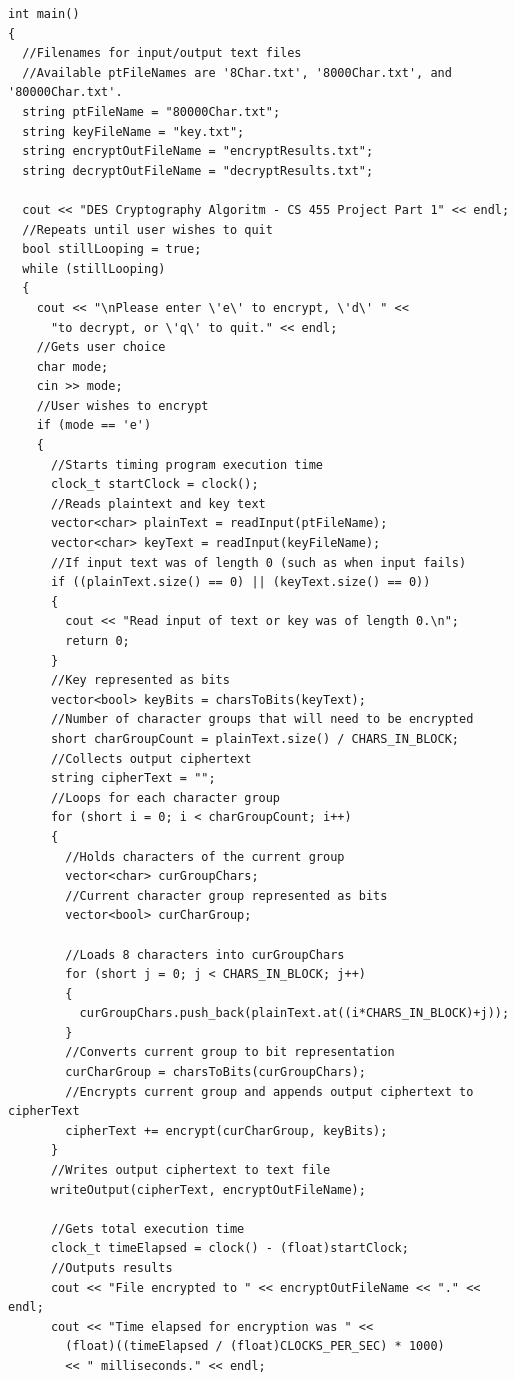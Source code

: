 \documentclass[11pt]{article}
\begin{document}
\begin{verbatim}
int main()
{
  //Filenames for input/output text files
  //Available ptFileNames are '8Char.txt', '8000Char.txt', and '80000Char.txt'.
  string ptFileName = "80000Char.txt";
  string keyFileName = "key.txt";
  string encryptOutFileName = "encryptResults.txt";
  string decryptOutFileName = "decryptResults.txt";

  cout << "DES Cryptography Algoritm - CS 455 Project Part 1" << endl;
  //Repeats until user wishes to quit
  bool stillLooping = true;
  while (stillLooping)
  {
    cout << "\nPlease enter \'e\' to encrypt, \'d\' " <<
      "to decrypt, or \'q\' to quit." << endl;
    //Gets user choice
    char mode;
    cin >> mode;
    //User wishes to encrypt
    if (mode == 'e')
    {
      //Starts timing program execution time
      clock_t startClock = clock();
      //Reads plaintext and key text
      vector<char> plainText = readInput(ptFileName);
      vector<char> keyText = readInput(keyFileName);
      //If input text was of length 0 (such as when input fails)
      if ((plainText.size() == 0) || (keyText.size() == 0))
      {
        cout << "Read input of text or key was of length 0.\n";
        return 0;
      }
      //Key represented as bits
      vector<bool> keyBits = charsToBits(keyText);
      //Number of character groups that will need to be encrypted
      short charGroupCount = plainText.size() / CHARS_IN_BLOCK;
      //Collects output ciphertext
      string cipherText = "";
      //Loops for each character group
      for (short i = 0; i < charGroupCount; i++)
      {
        //Holds characters of the current group
        vector<char> curGroupChars;
        //Current character group represented as bits
        vector<bool> curCharGroup;

        //Loads 8 characters into curGroupChars
        for (short j = 0; j < CHARS_IN_BLOCK; j++)
        {
          curGroupChars.push_back(plainText.at((i*CHARS_IN_BLOCK)+j));
        }
        //Converts current group to bit representation
        curCharGroup = charsToBits(curGroupChars);
        //Encrypts current group and appends output ciphertext to cipherText
        cipherText += encrypt(curCharGroup, keyBits);
      }
      //Writes output ciphertext to text file
      writeOutput(cipherText, encryptOutFileName);

      //Gets total execution time
      clock_t timeElapsed = clock() - (float)startClock;
      //Outputs results
      cout << "File encrypted to " << encryptOutFileName << "." << endl;
      cout << "Time elapsed for encryption was " <<
        (float)((timeElapsed / (float)CLOCKS_PER_SEC) * 1000)
        << " milliseconds." << endl;


\end{verbatim}
\end{document}

